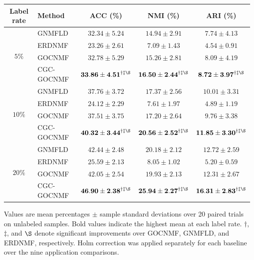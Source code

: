 \documentclass[11pt]{article}
\newenvironment{widetable}
  {\begin{strip}\centering\captionsetup{type=table}}
  {\end{strip}}
\theoremstyle{remark}
\begin{document}
\begin{widetable}
\centering
\caption{Clustering performance on NEU-CLS at different label rates.}
\label{tab:neu_performance}
\small
\setlength{\tabcolsep}{20.2pt}
\begin{tabular}{clccc}
\toprule
Label rate & Method & ACC (\%) & NMI (\%) & ARI (\%) \\
\midrule
\multirow{4}{*}{$5\%$}
& GNMFLD & $32.34\pm5.24$ & $14.94\pm2.91$ & $7.74\pm4.13$ \\
& ERDNMF & $23.26\pm2.61$ & $7.09\pm1.43$ & $4.54\pm0.91$ \\
& GOCNMF & $32.78\pm5.29$ & $15.26\pm2.81$ & $8.09\pm4.19$ \\
& CGC-GOCNMF & $\mathbf{33.86\pm4.51}^{\dagger\ddagger\S}$ & $\mathbf{16.50\pm2.44}^{\dagger\ddagger\S}$ & $\mathbf{8.72\pm3.97}^{\dagger\ddagger\S}$ \\
\midrule
\multirow{4}{*}{$10\%$}
& GNMFLD & $37.76\pm3.72$ & $17.37\pm2.56$ & $10.01\pm3.31$ \\
& ERDNMF & $24.12\pm2.29$ & $7.61\pm1.97$ & $4.89\pm1.19$ \\
& GOCNMF & $37.51\pm3.75$ & $17.20\pm2.64$ & $9.76\pm3.38$ \\
& CGC-GOCNMF & $\mathbf{40.32\pm3.44}^{\dagger\ddagger\S}$ & $\mathbf{20.56\pm2.52}^{\dagger\ddagger\S}$ & $\mathbf{11.85\pm3.30}^{\dagger\ddagger\S}$ \\
\midrule
\multirow{4}{*}{$20\%$}
& GNMFLD & $42.44\pm2.48$ & $20.18\pm2.12$ & $12.72\pm2.59$ \\
& ERDNMF & $25.59\pm2.13$ & $8.05\pm1.02$ & $5.20\pm0.59$ \\
& GOCNMF & $42.05\pm2.54$ & $19.93\pm2.13$ & $12.31\pm2.67$ \\
& CGC-GOCNMF & $\mathbf{46.90\pm2.38}^{\dagger\ddagger\S}$ & $\mathbf{25.94\pm2.27}^{\dagger\ddagger\S}$ & $\mathbf{16.31\pm2.83}^{\dagger\ddagger\S}$ \\
\bottomrule
\end{tabular}

\vspace{1mm}
\parbox{0.98\linewidth}{\footnotesize Values are mean percentages $\pm$ sample standard deviations over 20 paired trials on unlabeled samples. Bold values indicate the highest mean at each label rate. $\dagger$, $\ddagger$, and $\S$ denote significant improvements over GOCNMF, GNMFLD, and ERDNMF, respectively. Holm correction was applied separately for each baseline over the nine application comparisons.}
\end{widetable}
\end{document}
